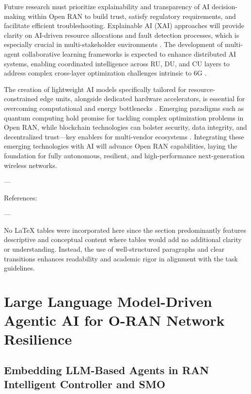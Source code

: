 \documentclass[11pt]{article}
\begin{document}
\begin{itemize}
Future research must prioritize explainability and transparency of AI decision-making within Open RAN to build trust, satisfy regulatory requirements, and facilitate efficient troubleshooting. Explainable AI (XAI) approaches will provide clarity on AI-driven resource allocations and fault detection processes, which is especially crucial in multi-stakeholder environments \cite{ref54}. The development of multi-agent collaborative learning frameworks is expected to enhance distributed AI systems, enabling coordinated intelligence across RU, DU, and CU layers to address complex cross-layer optimization challenges intrinsic to 6G \cite{ref48}.

The creation of lightweight AI models specifically tailored for resource-constrained edge units, alongside dedicated hardware accelerators, is essential for overcoming computational and energy bottlenecks \cite{ref50}. Emerging paradigms such as quantum computing hold promise for tackling complex optimization problems in Open RAN, while blockchain technologies can bolster security, data integrity, and decentralized trust—key enablers for multi-vendor ecosystems \cite{ref54}. Integrating these emerging technologies with AI will advance Open RAN capabilities, laying the foundation for fully autonomous, resilient, and high-performance next-generation wireless networks.

---

References: \cite{ref21,ref22,ref23,ref24,ref25,ref48,ref49,ref50,ref54}

---

No LaTeX tables were incorporated here since the section predominantly features descriptive and conceptual content where tables would add no additional clarity or understanding. Instead, the use of well-structured paragraphs and clear transitions enhances readability and academic rigor in alignment with the task guidelines.

\section{Large Language Model-Driven Agentic AI for O-RAN Network Resilience}

\subsection{Embedding LLM-Based Agents in RAN Intelligent Controller and SMO}


\end{itemize}
\end{document}
